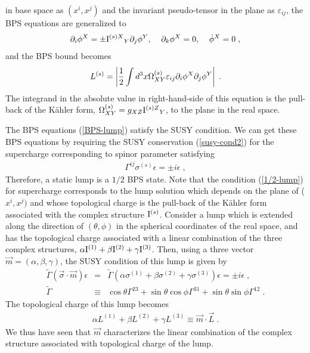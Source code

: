 \documentclass[a4paper,12pt]{article}
\newcommand{\kahler}{K\"{a}hler }
\begin{document}
in base space as $(x^i,x^j)$ and the invariant pseudo-tensor 
in the plane as $\varepsilon_{ij}$, the BPS equations are generalized to 
\begin{eqnarray}
  \partial_i\phi^X = \pm {{\rm I}^{(s)X}}_Y
   \partial_j\phi^Y, 
   \;\;\;\; 
   \partial_k\phi^X=0, 
   \;\;\;\; 
  \dot{\phi}^X = 0 \;,
\label{BPS-lump}
\end{eqnarray}
and the BPS bound becomes
\begin{eqnarray}
  L^{(s)} = \left|{1 \over 2} \int d^3x \Omega^{(s)}_{XY}\varepsilon_{ij} 
     \partial_i\phi^X\partial_j\phi^Y \right|\;. 
\end{eqnarray}
The integrand in the absolute value in right-hand-side of this equation 
is the pull-back of the \kahler form,  
$\Omega^{(s)}_{XY}=g_{XZ}{{\rm I}^{(s)Z}}_{Y}$, 
to the plane in the real space.

The BPS equations (\ref{BPS-lump}) satisfy the SUSY condition.
We can get these BPS equations by requiring the SUSY conservation 
(\ref{susy-cond2}) for the supercharge corresponding to spinor parameter 
satisfying 
\begin{eqnarray}
\Gamma ^{ij}\sigma ^{(s)}\epsilon = \pm i \epsilon \;, 
\label{1/2-lump}
\end{eqnarray}
Therefore, a static lump is a $1/2$ BPS state. 
Note that the condition (\ref{1/2-lump}) for supercharge  
corresponds to the lump solution which depends 
on the plane of ($x^i,x^j)$ and 
whose topological charge is the pull-back
of the \kahler form associated with 
the complex structure ${\rm I}^{(s)}$. 
Consider a lump which is extended along 
the direction of $(\theta,\phi)$ in the spherical coordinates of 
the real space, and has the topological 
charge associated with a linear combination of 
the three complex structures, 
$\alpha{\rm I}^{(1)}+\beta{\rm I}^{(2)}+\gamma{\rm I}^{(3)}$. 
Then, using a three vector $\vec{m}=(\alpha, \beta, \gamma)$, 
the SUSY condition of this lump is given by
\begin{eqnarray}
\tilde{\Gamma}(\vec{\sigma}\cdot \vec{m})\epsilon &=&
\tilde{\Gamma}(\alpha\sigma^{(1)}+\beta\sigma^{(2)}+\gamma\sigma^{(3)})
 \epsilon = \pm i\epsilon \;, \\
\tilde{\Gamma}&\equiv &\cos \theta \Gamma^{23}+\sin \theta\cos \phi 
\Gamma^{31}+\sin \theta \sin \phi \Gamma^{12} \; .
\label{general-gamma}
\end{eqnarray}
The topological charge of this lump becomes 
\begin{eqnarray}
 \alpha L^{(1)}+\beta L^{(2)}+\gamma L^{(3)}
 \equiv \vec{m}\cdot \vec{L}\; .
\end{eqnarray}
We thus have seen that $\vec{m}$ characterizes the linear combination 
 of the complex 
structure associated with topological charge of the lump.
\end{document}

